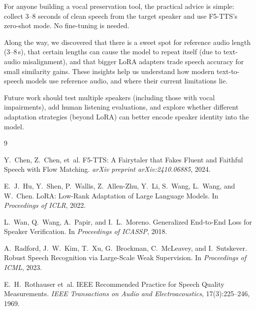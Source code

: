 \documentclass[11pt, a4paper]{article}
\begin{document}
For anyone building a vocal preservation tool, the practical advice is simple: collect 3--8 seconds of clean speech from the target speaker and use F5-TTS's zero-shot mode. No fine-tuning is needed.

Along the way, we discovered that there is a sweet spot for reference audio length (3--8\,s), that certain lengths can cause the model to repeat itself (due to text-audio misalignment), and that bigger LoRA adapters trade speech accuracy for small similarity gains. These insights help us understand how modern text-to-speech models use reference audio, and where their current limitations lie.

Future work should test multiple speakers (including those with vocal impairments), add human listening evaluations, and explore whether different adaptation strategies (beyond LoRA) can better encode speaker identity into the model.


\begin{thebibliography}{9}

Y.~Chen, Z.~Chen, et~al.
\newblock F5-TTS: A Fairytaler that Fakes Fluent and Faithful Speech with Flow Matching.
\newblock \emph{arXiv preprint arXiv:2410.06885}, 2024.

E.~J.~Hu, Y.~Shen, P.~Wallis, Z.~Allen-Zhu, Y.~Li, S.~Wang, L.~Wang, and W.~Chen.
\newblock LoRA: Low-Rank Adaptation of Large Language Models.
\newblock In \emph{Proceedings of ICLR}, 2022.

L.~Wan, Q.~Wang, A.~Papir, and I.~L.~Moreno.
\newblock Generalized End-to-End Loss for Speaker Verification.
\newblock In \emph{Proceedings of ICASSP}, 2018.

A.~Radford, J.~W.~Kim, T.~Xu, G.~Brockman, C.~McLeavey, and I.~Sutskever.
\newblock Robust Speech Recognition via Large-Scale Weak Supervision.
\newblock In \emph{Proceedings of ICML}, 2023.

E.~H.~Rothauser et~al.
\newblock IEEE Recommended Practice for Speech Quality Measurements.
\newblock \emph{IEEE Transactions on Audio and Electroacoustics}, 17(3):225--246, 1969.

\end{thebibliography}
\end{document}
